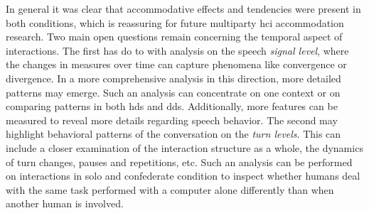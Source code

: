 In general it was clear that accommodative effects and tendencies were present in both conditions, which is reassuring for future multiparty \ac{hci} accommodation research.
Two main open questions remain concerning the temporal aspect of interactions.
The first has do to with analysis on the speech \emph{signal level}, where the changes in measures over time can capture phenomena like convergence or divergence.
In a more comprehensive analysis in this direction, more detailed patterns may emerge.
Such an analysis can concentrate on one context or on comparing patterns in both \ac{hds} and \ac{dds}.
Additionally, more features can be measured to reveal more details regarding speech behavior.
The second may highlight behavioral patterns of the conversation on the \emph{turn levels}.
This can include a closer examination of the interaction structure as a whole, the dynamics of turn changes, pauses and repetitions, etc.
Such an analysis can be performed on interactions in solo and confederate condition to inspect whether humans deal with the same task performed with a computer alone differently than when another human is involved.